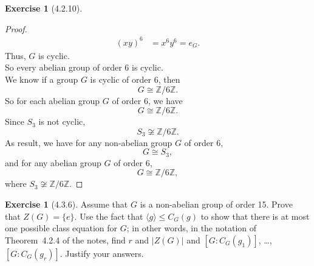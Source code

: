\documentclass{amsart}
\newcommand{\bbz}{\mathbb{Z}}
\theoremstyle{plain}
\theoremstyle{definition}
\newtheorem{exer}[lem]{Exercise}
\begin{document}
\begin{exer}[4.2.10]
\begin{proof}
\begin{align*}
  (xy)^6 &= x^6y^6 = e_G.
\end{align*}
Thus, $G$ is cyclic.\\
So every abelian group of order 6 is cyclic.\\
We know if a group $G$ is cyclic of order 6, then 
\[G \cong \bbz/6\bbz.\]
So for each abelian group $G$ of order 6, we have 
\[ G \cong \bbz/6\bbz.\]
Since $S_3$ is not cyclic,
\[S_3 \not\cong \bbz/6\bbz.\]
As result, we have for any non-abelian group $G$ of order 6, 
\[G \cong S_3, \] 
and for any abelian group $G$ of order 6,
\[G \cong \bbz/6\bbz,\]
where $S_3 \not\cong \bbz/6\bbz$.



\end{proof}
\end{exer}

\begin{exer}[4.3.6]
Assume that $G$ is a non-abelian group of order 15. 
Prove that $Z(G)=\{e\}$. 
Use the fact that $\langle g\rangle\leq C_G(g)$ to show that there is at most one possible class equation for $G$;
in other words, in the notation of Theorem~4.2.4 of the notes, find $r$ and $|Z(G)|$ and $[G:C_G(g_1)]$, \ldots, $[G:C_G(g_r)]$.
Justify your answers.
\end{exer}
\end{document}
